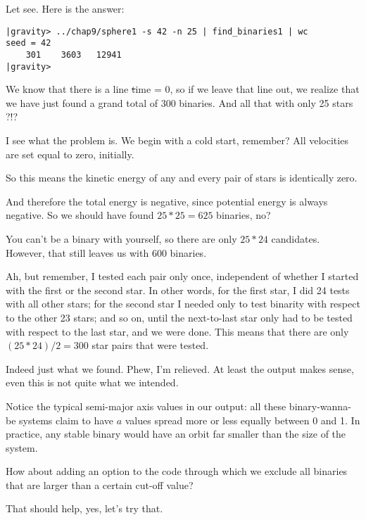 \bob
Let see.  Here is the answer:

\cba

\begin{small}
\begin{verbatim}
|gravity> ../chap9/sphere1 -s 42 -n 25 | find_binaries1 | wc
seed = 42
    301    3603   12941
|gravity> 
\end{verbatim}
\end{small}

\abc

\bob
We know that there is a line {\st time = 0}, so if we leave that line
out, we realize that we have just found a grand total of 300 binaries.
And all that with only 25 stars ?!?

\alice
I see what the problem is.  We begin with a cold start, remember?  All
velocities are set equal to zero, initially.

\carol
So this means the kinetic energy of any and every pair of stars is
identically zero.

\bob
And therefore the total energy is negative, since potential energy is
always negative.  So we should have found $25 * 25 = 625$ binaries, no?

\alice
You can't be a binary with yourself, so there are only $25 * 24$
candidates.  However, that still leaves us with 600 binaries.

\carol
Ah, but remember, I tested each pair only once, independent of whether
I started with the first or the second star.  In other words, for the
first star, I did 24 tests with all other stars; for the second star I
needed only to test binarity with respect to the other 23 stars; and
so on, until the next-to-last star only had to be tested with respect
to the last star, and we were done.  This means that there are only
$(25*24)/2 = 300$ star pairs that were tested.

\bob
Indeed just what we found.  Phew, I'm relieved.  At least the output
makes sense, even this is not quite what we intended.

\alice
Notice the typical semi-major axis values in our output: all these
binary-wanna-be systems claim to have $a$ values spread more or less
equally between 0 and 1.  In practice, any stable binary would have an
orbit far smaller than the size of the system.

\carol
How about adding an option to the code through which we exclude all
binaries that are larger than a certain cut-off value?

\bob
That should help, yes, let's try that.

